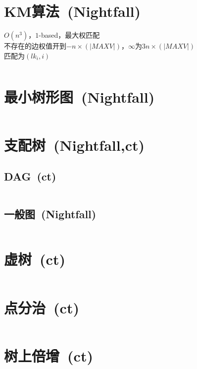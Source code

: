 \section{KM算法\ \small(Nightfall)}
	$ O(n^3) $，$ 1 $-based，最大权匹配
	\\不存在的边权值开到$ -n \times (\left| MAXV \right|) $，$ \infty $为$ 3 n \times (\left| MAXV \right|) $
	\\匹配为$ (lk_i, i) $
	\inputminted{cpp}{GraphTheory/km.cpp}
\section{最小树形图\ \small(Nightfall)}
	\inputminted{cpp}{GraphTheory/zhu_liu.cpp}
\section{支配树\ \small(Nightfall,ct)}
	\subsection*{DAG\ \small(ct)}
		\inputminted{cpp}{GraphTheory/dominator_tree_dag.cpp}
	\subsection*{一般图\ \small(Nightfall)}
		\inputminted{cpp}{GraphTheory/dominator_tree.cpp}
\section{虚树\ \small(ct)}
	\inputminted{cpp}{GraphTheory/virtual_tree.cpp}
\section{点分治\ \small(ct)}
	\inputminted{cpp}{GraphTheory/divide_conquer_on_tree.cpp}
\section{树上倍增\ \small(ct)}
	\inputminted{cpp}{GraphTheory/multiplier_on_tree.cpp}
